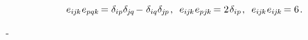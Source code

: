 \nopagebreak\vspace{-0.3em}\begin{equation}\label{veblencontraction}
e_{i\hspace{-0.1ex}j\hspace{-0.1ex}k} \hspace{.1ex} e_{pqk} \hspace{-0.25ex} = \delta_{ip} \delta_{\hspace{-0.1ex}j\hspace{-0.1ex}q} \hspace{-0.25ex} - \hspace{.1ex} \delta_{iq} \delta_{\hspace{-0.1ex}j\hspace{-0.1ex}p}
\hspace{.2ex} ,
\hspace{.5em}
%
e_{i\hspace{-0.1ex}j\hspace{-0.1ex}k} \hspace{.1ex} e_{pj\hspace{-0.1ex}k} \hspace{-0.25ex} = 2 \hspace{.2ex} \delta_{ip}
\hspace{.2ex} ,
\hspace{.5em}
%
e_{i\hspace{-0.1ex}j\hspace{-0.1ex}k} \hspace{.1ex} e_{i\hspace{-0.1ex}j\hspace{-0.1ex}k} \hspace{-0.25ex} = 6
\hspace{.2ex} .
\end{equation}

\hbox{\hspace{-0.2ex}\inquotes{${\hspace{-0.25ex}\times\hspace{-0.1ex}}$}\hspace{-0.2ex}-}


